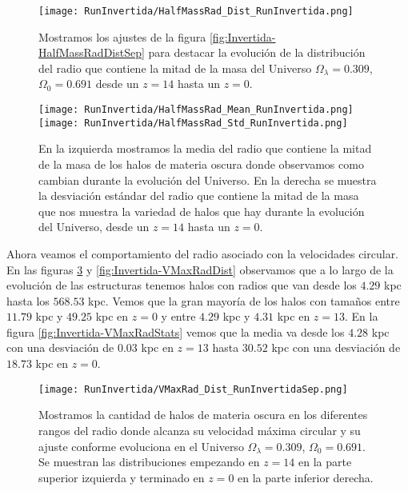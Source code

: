 \begin{figure}[H]
    \centering
    \texttt{[image: RunInvertida/HalfMassRad\_Dist\_RunInvertida.png]}
    \caption[Distribución del Radio que contiene la mitad de la masa]{\footnotesize Mostramos los ajustes de la figura \ref{fig:Invertida-HalfMassRadDistSep} para destacar la evolución de la distribución del radio que contiene la mitad de la masa del Universo $\Omega_\lambda = 0.309 $, $\Omega_0 = 0.691$ desde un $z=14$ hasta un $z=0$.}
    \label{fig:Invertida-HalfMassRadDist}
\end{figure}

\begin{figure}[H]
    \centering
    \texttt{[image: RunInvertida/HalfMassRad\_Mean\_RunInvertida.png]}
    \texttt{[image: RunInvertida/HalfMassRad\_Std\_RunInvertida.png]}
    \caption[Media y desviación estándar del radio de la mitad de la masa]{\footnotesize En la izquierda mostramos la media del radio que contiene la mitad de la masa de los halos de materia oscura donde observamos como cambian durante la evolución del Universo. En la derecha se muestra la desviación estándar del radio que contiene la mitad de la masa que nos muestra la variedad de halos que hay durante la evolución del Universo, desde un $z=14$ hasta un $z=0$.}
    \label{fig:Invertida-HalfMassRadStats}
\end{figure}

Ahora veamos el comportamiento del radio asociado con la velocidades circular. En las figuras \ref{fig:Invertida-VMaxRadDistSep} y \ref{fig:Invertida-VMaxRadDist} observamos que a lo largo de la evolución de las estructuras tenemos halos con radios que van desde los $4.29$ kpc hasta los $568.53$ kpc. Vemos que la gran mayoría de los halos con tamaños entre $11.79$ kpc y $49.25$ kpc en $z=0$ y entre $4.29$ kpc y $4.31$ kpc en $z=13$. En la figura \ref{fig:Invertida-VMaxRadStats} vemos que la media va desde los $4.28$ kpc con una desviación de $0.03$ kpc en $z=13$ hasta $30.52$ kpc con una desviación de $18.73$ kpc en $z=0$.

\begin{figure}[H]
    \centering
    \texttt{[image: RunInvertida/VMaxRad\_Dist\_RunInvertidaSep.png]}
    \caption[Radio donde se alcanza la velocidad máxima circular]{\footnotesize Mostramos la cantidad de halos de materia oscura en los diferentes rangos del radio donde alcanza su velocidad máxima circular y su ajuste conforme evoluciona en el Universo $\Omega_\lambda = 0.309 $, $\Omega_0 = 0.691$. Se muestran las distribuciones empezando en $z=14$ en la parte superior izquierda y terminado en $z=0$ en la parte inferior derecha.}
    \label{fig:Invertida-VMaxRadDistSep}
\end{figure}

